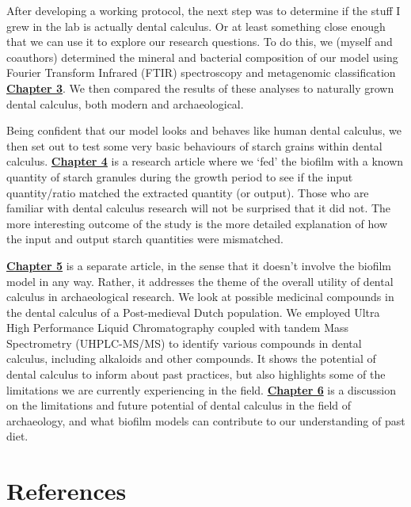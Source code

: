 \documentclass[
  letterpaper,
]{book}
\begin{document}
After developing a working protocol, the next step was to determine if
the stuff I grew in the lab is actually dental calculus. Or at least
something close enough that we can use it to explore our research
questions. To do this, we (myself and coauthors) determined the mineral
and bacterial composition of our model using Fourier Transform Infrared
(FTIR) spectroscopy and metagenomic classification
\protect\hyperlink{byoc-valid}{\textbf{Chapter 3}}. We then compared the
results of these analyses to naturally grown dental calculus, both
modern and archaeological.

Being confident that our model looks and behaves like human dental
calculus, we then set out to test some very basic behaviours of starch
grains within dental calculus.
\protect\hyperlink{byoc-starch}{\textbf{Chapter 4}} is a research
article where we `fed' the biofilm with a known quantity of starch
granules during the growth period to see if the input quantity/ratio
matched the extracted quantity (or output). Those who are familiar with
dental calculus research will not be surprised that it did not. The more
interesting outcome of the study is the more detailed explanation of how
the input and output starch quantities were mismatched.

\protect\hyperlink{mb11CalculusPilot}{\textbf{Chapter 5}} is a separate
article, in the sense that it doesn't involve the biofilm model in any
way. Rather, it addresses the theme of the overall utility of dental
calculus in archaeological research. We look at possible medicinal
compounds in the dental calculus of a Post-medieval Dutch population. We
employed Ultra High Performance Liquid Chromatography coupled with
tandem Mass Spectrometry (UHPLC-MS/MS) to identify various compounds in
dental calculus, including alkaloids and other compounds. It shows the
potential of dental calculus to inform about past practices, but also
highlights some of the limitations we are currently experiencing in the
field. \protect\hyperlink{chap-discussion}{\textbf{Chapter 6}} is a
discussion on the limitations and future potential of dental calculus in
the field of archaeology, and what biofilm models can contribute to our
understanding of past diet.

\hypertarget{references}{%
\section*{References}\label{references}}

\end{document}
